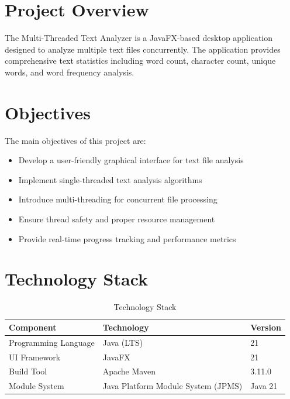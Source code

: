 \documentclass[12pt,a4paper]{report}
\begin{document}
\section{Project Overview}
The Multi-Threaded Text Analyzer is a JavaFX-based desktop application designed to analyze multiple text files concurrently. The application provides comprehensive text statistics including word count, character count, unique words, and word frequency analysis.

\section{Objectives}
The main objectives of this project are:
\begin{itemize}
    \item Develop a user-friendly graphical interface for text file analysis
    \item Implement single-threaded text analysis algorithms
    \item Introduce multi-threading for concurrent file processing
    \item Ensure thread safety and proper resource management
    \item Provide real-time progress tracking and performance metrics
\end{itemize}

\section{Technology Stack}
\begin{table}[H]
\centering
\begin{tabularx}{\textwidth}{|l|X|l|}
\hline
\textbf{Component} & \textbf{Technology} & \textbf{Version} \\
\hline
Programming Language & Java (LTS) & 21 \\
\hline
UI Framework & JavaFX & 21 \\
\hline
Build Tool & Apache Maven & 3.11.0 \\
\hline
Module System & Java Platform Module System (JPMS) & Java 21 \\
\hline
\end{tabularx}
\caption{Technology Stack}
\end{table}
\end{document}
